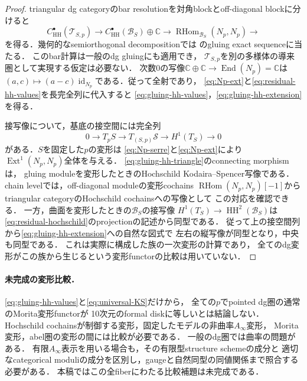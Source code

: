 \documentclass[11pt,a4paper]{ltjsarticle}
\theoremstyle{definition}
\newcommand{\BB}{\mathcal B}
\newcommand{\TT}{\mathcal T}
\newcommand{\RHom}{\operatorname{RHom}}
\newcommand{\End}{\operatorname{End}}
\newcommand{\Ext}{\operatorname{Ext}}
\newcommand{\id}{\operatorname{id}}
\begin{document}
\begin{proof}
triangular dg categoryのbar resolutionを対角blockとoff-diagonal blockに分けると
\begin{equation}\label{eq:gluing-hh-triangle}
 C^\bullet_{\mathrm{HH}}(\TT_{S,p})
 \longrightarrow C^\bullet_{\mathrm{HH}}(\BB_S)\oplus\mathbb C
 \longrightarrow\RHom_{\BB_S}(N_p,N_p)\longrightarrow
\end{equation}
を得る．幾何的なsemiorthogonal decompositionでは
\cite[Theorem~7.7, Remark~7.8]{Kuznetsov}のgluing exact sequenceに当たる．
このbar計算は一般のdg gluingにも適用でき，
$\TT_{S,p}$を別の多様体の導来圏として実現する仮定は必要ない．
次数0の写像$\mathbb C\oplus\mathbb C\to\End(N_p)=\mathbb C$は
$(a,c)\mapsto(a-c)\id_{N_p}$である．従って全射であり，
\eqref{eq:Np-ext}と\eqref{eq:residual-hh-values}を長完全列に代入すると
\eqref{eq:gluing-hh-values}，\eqref{eq:gluing-hh-extension}を得る．

接写像について，基底の接空間には完全列
\[
 0\longrightarrow T_pS\longrightarrow T_{(S,p)}\mathcal S
 \longrightarrow H^1(T_S)\longrightarrow0
\]
がある．$S$を固定した$p$の変形は
\eqref{eq:Np-serre}と\eqref{eq:Np-ext}により
$\Ext^1(N_p,N_p)$全体を与える．
\eqref{eq:gluing-hh-triangle}のconnecting morphismは，
gluing moduleを変形したときのHochschild Kodaira--Spencer写像である．
chain levelでは，off-diagonal moduleの変形cochains
$\RHom(N_p,N_p)[-1]$からtriangular categoryのHochschild cochainsへの写像として
この対応を確認できる．
一方，曲面を変形したときの$\BB_S$の接写像
$H^1(T_S)\to\operatorname{HH}^2(\BB_S)$は
\eqref{eq:residual-hochschild}のprojectionの記述から同型である．
従って上の接空間列から\eqref{eq:gluing-hh-extension}への自然な図式で
左右の縦写像が同型となり，中央も同型である．
これは実際に構成した族の一次変形の計算であり，
全てのdg変形がこの族から生じるという変形functorの比較は用いていない．
\end{proof}

\paragraph{未完成の変形比較．}
\eqref{eq:gluing-hh-values}と\eqref{eq:universal-KS}だけから，
全ての$p$でpointed dg圏の通常のMorita変形functorが
10次元のformal diskに等しいとは結論しない．
Hochschild cochainsが制御する変形，固定したモデルの非曲率$A_\infty$変形，
Morita変形，abel圏の変形の間には比較が必要である．
一般のdg圏では曲率の問題がある\cite{KellerLowen}．
有限$A_\infty$表示を用いる場合も，その有限型structure schemeの成分と
適切なcategorical moduliの成分を区別し，gaugeと自然同型の同値関係まで照合する必要がある．
本稿ではこの全fiberにわたる比較補題は未完成である．
\end{document}
